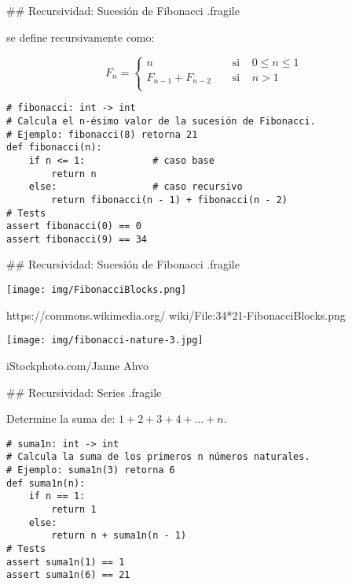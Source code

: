 ## Recursividad: Sucesión de Fibonacci {.fragile}

\bgnblocknormal
{} se define recursivamente como:
\trmblocknormal

\vspace{-2ex}

$$ F_n = \begin{cases}
        n                 & \;\;\;\;\text{si} \;\;\;\; 0 \leq n \leq 1 \\
        F_{n-1} + F_{n-2} & \;\;\;\;\text{si} \;\;\;\; n > 1 \\
    \end{cases}
$$

\vspace{1ex}
\begin{lstlisting}[style=frame02]
# fibonacci: int -> int
# Calcula el n-ésimo valor de la sucesión de Fibonacci.
# Ejemplo: fibonacci(8) retorna 21
def fibonacci(n):
    if n <= 1:            # caso base
        return n
    else:                 # caso recursivo
        return fibonacci(n - 1) + fibonacci(n - 2)
# Tests
assert fibonacci(0) == 0
assert fibonacci(9) == 34
\end{lstlisting}

## Recursividad: Sucesión de Fibonacci {.fragile}

\bgncolumns
{}

\texttt{[image: img/FibonacciBlocks.png]}

\footnotesize{https://commons.wikimedia.org/
wiki/File:34*21-FibonacciBlocks.png}

\texttt{[image: img/fibonacci-nature-3.jpg]}

\footnotesize{iStockphoto.com/Janne Ahvo}

\trmcolumns

## Recursividad: Series {.fragile}

\bgnblockgood
{} Determine la suma de: $1 + 2 + 3 + 4 + \ldots + n$.
\trmblockgood

\pause

\begin{lstlisting}[style=frame02]
# suma1n: int -> int
# Calcula la suma de los primeros n números naturales.
# Ejemplo: suma1n(3) retorna 6
def suma1n(n):
    if n == 1:
        return 1
    else:
        return n + suma1n(n - 1)
# Tests
assert suma1n(1) == 1
assert suma1n(6) == 21
\end{lstlisting}

